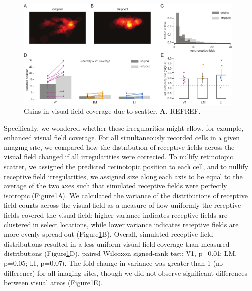 \begin{figure}[t!]
    \includegraphics[width=\textwidth]{figures/chapter_3/fig_3-5_vf_coverage/fig_3-5_vf_coverage.pdf}
    \vspace{.1in}
    \caption[Compensatory visual field coverage]{Gains in visual field coverage due to scatter. 
    \textbf{A.} REFREF.
    \label{fig:vf_coverage}}
\end{figure}

Specifically, we wondered whether these irregularities might allow, for example, enhanced visual field coverage. For all simultaneously recorded cells in a given imaging site, we compared how the distribution of receptive fields across the visual field changed if all irregularities were corrected. To nullify retinotopic scatter, we assigned the predicted retinotopic position to each cell, and to nullify receptive field irregularities, we assigned size along each axis to be equal to the average of the two axes such that simulated receptive fields were perfectly isotropic (Figure\ref{fig:vf_coverage}A). We calculated the variance of the distributions of receptive field counts across the visual field as a measure of how uniformly the receptive fields covered the visual field:  higher variance indicates receptive fields are clustered in select locations, while lower variance indicates receptive fields are more evenly spread out (Figure\ref{fig:vf_coverage}B). Overall, simulated receptive field distributions resulted in a less uniform visual field coverage than measured distributions (Figure\ref{fig:vf_coverage}D), paired Wilcoxon signed-rank test: V1, p=0.01; LM, p=0.05; LI, p=0.07). The fold-change in variance was greater than 1 (no difference) for all imaging sites, though we did not observe significant differences between visual areas (Figure\ref{fig:vf_coverage}E). 



